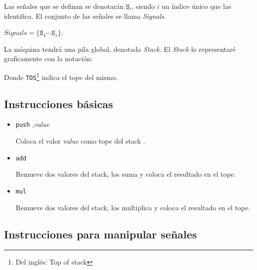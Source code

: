   Las señales que se definan se denotarán $\texttt{S}_i$, siendo $i$ un
  índice único que las identifica. El conjunto de las señales se llama
  \textit{Signals}.

  \begin{center}
    $\textit{Signals} = \{\texttt{S}_1 \dotsb \texttt{S}_s\}$.
  \end{center}

  La máquina tendrá una pila global, denotada \textit{Stack}.
  El \textit{Stack} lo representaré graficamente con la notación:

  

  Donde \texttt{TOS}\footnote{Del inglés: Top
    of stack} indica el tope del mismo.


\subsection{Instrucciones básicas}

\begin{itemize}

\item {
    \texttt{push} ,\textit{value}

    Coloca el valor \textit{value} como tope del stack .

    
}
\item {
    \texttt{add}

      Remueve dos valores del stack, los suma y coloca el resultado en
    el tope.

    
}
\item {
    \texttt{mul}

      Remueve dos valores del stack, los multiplica y coloca el resultado en
    el tope.

    
}
\end{itemize}

\subsection{Instrucciones para manipular señales}
  
